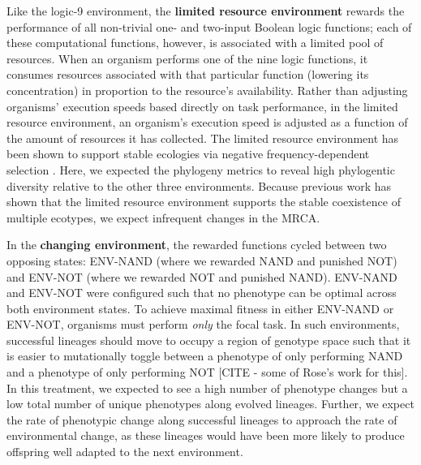 \documentclass[letterpaper]{article}
\begin{document}
Like the logic-9 environment, the \textbf{limited resource environment} rewards the performance of all non-trivial one- and two-input Boolean logic functions; each of these computational functions, however, is associated with a limited pool of resources. When an organism performs one of the nine logic functions, it consumes resources associated with that particular function (lowering its concentration) in proportion to the resource's availability. 
Rather than adjusting organisms' execution speeds based directly on task performance, in the limited resource environment, an organism's execution speed is adjusted as a function of the amount of resources it has collected.
The limited resource environment has been shown to support stable ecologies via negative frequency-dependent selection \citep{cooper_evolution_2003}. 
Here, we expected the phylogeny metrics to reveal high phylogentic diversity relative to the other three environments. 
Because previous work has shown that the limited resource environment supports the stable coexistence of multiple ecotypes, we expect infrequent changes in the MRCA.

In the \textbf{changing environment}, the rewarded functions cycled between 
two opposing states: ENV-NAND (where we rewarded NAND and punished NOT) and ENV-NOT (where we rewarded NOT and punished NAND). 
ENV-NAND and ENV-NOT were configured such that no phenotype can be optimal across both environment states. To achieve maximal fitness in either ENV-NAND or ENV-NOT, organisms must perform \textit{only} the focal task.
In such environments, successful lineages should move to occupy a region of genotype space such that it is easier to mutationally toggle between a phenotype of only performing NAND and a phenotype of only performing NOT [CITE - some of Rose's work for this].
In this treatment, we expected to see a high number of phenotype changes but a low total number of unique phenotypes along evolved lineages.
Further, we expect the rate of phenotypic change along successful lineages to approach the rate of environmental change, as these lineages would have been more likely to produce offspring well adapted to the next environment.
\end{document}
